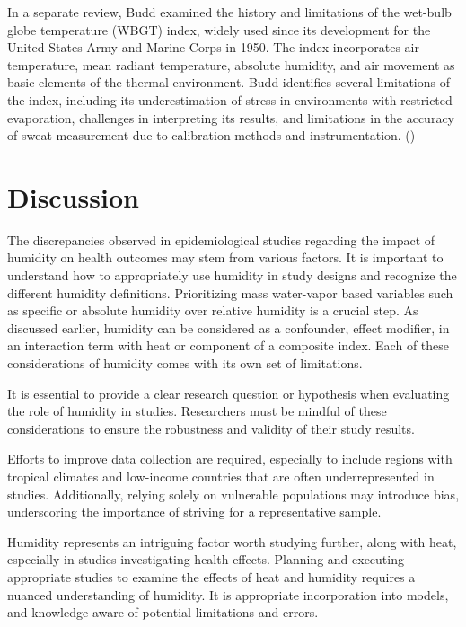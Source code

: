 \documentclass[
]{krantz}
\begin{document}
In a separate review, Budd examined the history and limitations of the wet-bulb globe temperature (WBGT) index, widely used since its development for the United States Army and Marine Corps in 1950. The index incorporates air temperature, mean radiant temperature, absolute humidity, and air movement as basic elements of the thermal environment. Budd identifies several limitations of the index, including its underestimation of stress in environments with restricted evaporation, challenges in interpreting its results, and limitations in the accuracy of sweat measurement due to calibration methods and instrumentation. (\citet{budd})

\section{Discussion}\label{discussion-2}

The discrepancies observed in epidemiological studies regarding the impact of humidity on health outcomes may stem from various factors. It is important to understand how to appropriately use humidity in study designs and recognize the different humidity definitions. Prioritizing mass water-vapor based variables such as specific or absolute humidity over relative humidity is a crucial step.
As discussed earlier, humidity can be considered as a confounder, effect modifier, in an interaction term with heat or component of a composite index. Each of these considerations of humidity comes with its own set of limitations.

It is essential to provide a clear research question or hypothesis when evaluating the role of humidity in studies. Researchers must be mindful of these considerations to ensure the robustness and validity of their study results.

Efforts to improve data collection are required, especially to include regions with tropical climates and low-income countries that are often underrepresented in studies. Additionally, relying solely on vulnerable populations may introduce bias, underscoring the importance of striving for a representative sample.

Humidity represents an intriguing factor worth studying further, along with heat, especially in studies investigating health effects. Planning and executing appropriate studies to examine the effects of heat and humidity requires a nuanced understanding of humidity. It is appropriate incorporation into models, and knowledge aware of potential limitations and errors.
\end{document}
